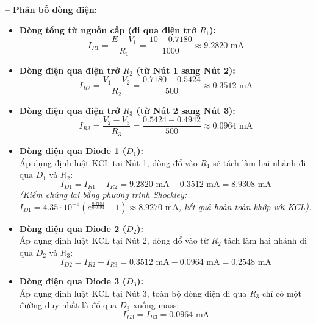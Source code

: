 \noindent \textbf{--} \textbf{Phân bố dòng điện:}
\begin{itemize}[label=\textbf{+}]
    \item \textbf{Dòng tổng từ nguồn cấp (đi qua điện trở $R_1$):}
    \begin{equation*}
        I_{R1} = \frac{E - V_1}{R_1} = \frac{10 - 0.7180}{1000} \approx 9.2820 \text{ mA}
    \end{equation*}

    \item \textbf{Dòng điện qua điện trở $R_2$ (từ Nút 1 sang Nút 2):}
    \begin{equation*}
        I_{R2} = \frac{V_1 - V_2}{R_2} = \frac{0.7180 - 0.5424}{500}\approx 0.3512 \text{ mA}
    \end{equation*}

    \item \textbf{Dòng điện qua điện trở $R_3$ (từ Nút 2 sang Nút 3):}
    \begin{equation*}
        I_{R3} = \frac{V_2 - V_3}{R_3} = \frac{0.5424 - 0.4942}{500}\approx 0.0964 \text{ mA}
    \end{equation*}

    \item \textbf{Dòng điện qua Diode 1 ($D_1$):} \\
    Áp dụng định luật KCL tại Nút 1, dòng đổ vào $R_1$ sẽ tách làm hai nhánh đi qua $D_1$ và $R_2$:
    \begin{equation*}
        I_{D1} = I_{R1} - I_{R2} = 9.2820 \text{ mA} - 0.3512 \text{ mA} = 8.9308 \text{ mA}
    \end{equation*}
    \textit{(Kiểm chứng lại bằng phương trình Shockley: $I_{D1} =  4.35 \cdot 10^{-9}(e^{\frac{0.7180}{0.0494}} - 1) \approx 8.9270 \text{ mA}$, kết quả hoàn toàn khớp với KCL).}

    \item \textbf{Dòng điện qua Diode 2 ($D_2$):} \\
    Áp dụng định luật KCL tại Nút 2, dòng đổ vào từ $R_2$ tách làm hai nhánh đi qua $D_2$ và $R_3$:
    \begin{equation*}
        I_{D2} = I_{R2} - I_{R3} = 0.3512 \text{ mA} - 0.0964 \text{ mA} = 0.2548 \text{ mA}
    \end{equation*}

    \item \textbf{Dòng điện qua Diode 3 ($D_3$):} \\
    Áp dụng định luật KCL tại Nút 3, toàn bộ dòng điện đi qua $R_3$ chỉ có một đường duy nhất là đổ qua $D_3$ xuống mass:
    \begin{equation*}
        I_{D3} = I_{R3} = 0.0964 \text{ mA}
    \end{equation*}
\end{itemize}

